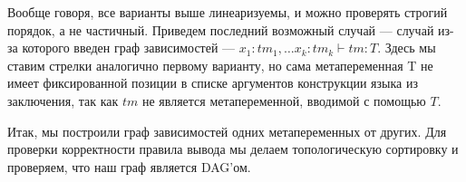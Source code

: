 Вообще говоря, все варианты выше линеаризуемы, и можно проверять строгий порядок, а не частичный. Приведем последний возможный случай --- случай из-за которого введен граф зависимостей --- $x_1 : tm_1, \ldots x_k : tm_k  \vdash tm : T$. Здесь мы ставим стрелки аналогично первому варианту, но сама метапеременная T не имеет фиксированной позиции в списке аргументов конструкции языка из заключения, так как $tm$ не является метапеременной, вводимой с помощью $T$.

Итак, мы построили граф зависимостей одних метапеременных от других. Для проверки корректности правила вывода мы делаем топологическую сортировку и проверяем, что наш граф является DAG'ом.
























